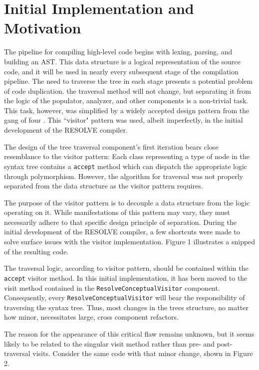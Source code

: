 \documentclass[times]{speauth}
\begin{document}
\section{Initial Implementation and Motivation}
The pipeline for compiling high-level code begins with lexing, parsing, and building an AST. This data structure is a logical representation of the source code, and it will be used in nearly every subsequent stage of the compilation pipeline. The need to traverse the tree in each stage presents a potential problem of code duplication. the traversal method will not change, but separating it from the logic of the populator, analyzer, and other components is a non-trivial task. This task, however, was simplified by a widely accepted design pattern from the gang of four \cite{gamma:1995}. This ``visitor" pattern was used, albeit imperfectly, in the initial development of the RESOLVE compiler.

The design of the tree traversal component's first iteration bears close resemblance to the visitor pattern: Each class representing a type of node in the syntax tree contains a \texttt{accept} method which can dispatch the appropriate logic through polymorphism. However, the algorithm for traversal was not properly separated from the data structure as the visitor pattern requires.

The purpose of the visitor pattern is to decouple a data structure from the logic operating on it. While manifestations of this pattern may vary, they must necessarily adhere to that specific design principle of separation. During the initial development of the RESOLVE compiler, a few shortcuts were made to solve surface issues with the visitor implementation. Figure 1 illustrates a snipped of the resulting code.

The traversal logic, according to visitor pattern, should be contained within the \texttt{accept} visitor method. In this initial implementation, it has been moved to the visit method contained in the \texttt{ResolveConceptualVisitor} component. Consequently, every \texttt{ResolveConceptualVisitor} will bear the responsibility of traversing the syntax tree. Thus, most changes in the trees structure, no matter how minor, necessitates large, cross component refactors.

The reason for the appearance of this critical flaw remains unknown, but it seems likely to be related to the singular visit method rather than pre- and post- traversal visits. Consider the same code with that minor change, shown in Figure 2.
\end{document}
